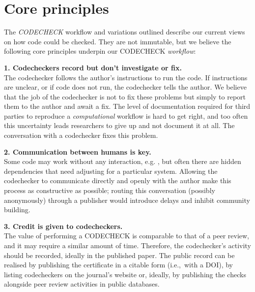 \documentclass[12pt]{article}
\newcommand{\rev}[1]{\textit{#1}}
\begin{document}
\section*{Core principles}\label{core-principles}

The \rev{CODECHECK} workflow and variations outlined describe our current
views on how code could be checked.  They are not immutable, but
we believe the following core principles underpin our CODECHECK
\rev{workflow}:

\textbf{1. Codecheckers record but don't investigate or fix.} \\
The codechecker follows the author's instructions to run the code. If
instructions are unclear, or if code does not run, the codechecker
tells the author. We believe that the job of the codechecker is not to
fix these problems but simply to report them to the author and await a
fix.  The level of documentation required for third parties to
reproduce a \rev{computational} workflow is hard to get right, and too often this
uncertainty leads researchers to give up and not document it at all.
The conversation with a codechecker fixes this problem.

\textbf{2. Communication between humans is key.} \\
Some code may work without any interaction, e.g. \cite{cert-2020-013},
but often there are hidden dependencies that need adjusting for a
particular system.  Allowing the codechecker to communicate directly
and openly with the author make this process as constructive as
possible; routing this conversation (possibly anonymously) through a
publisher would introduce delays and inhibit community building.

\textbf{3. Credit is given to codecheckers.} \\
The value of performing a CODECHECK is comparable to that of a peer
review, and it may require a similar amount of time. Therefore, the
codechecker's activity should be recorded, ideally in the published
paper.  The public record can be realised by publishing the
certificate in a citable form (i.e.,~with a DOI), by
listing codecheckers on the journal's website or, ideally, by
publishing the checks alongside peer review activities in public
databases.
\end{document}
